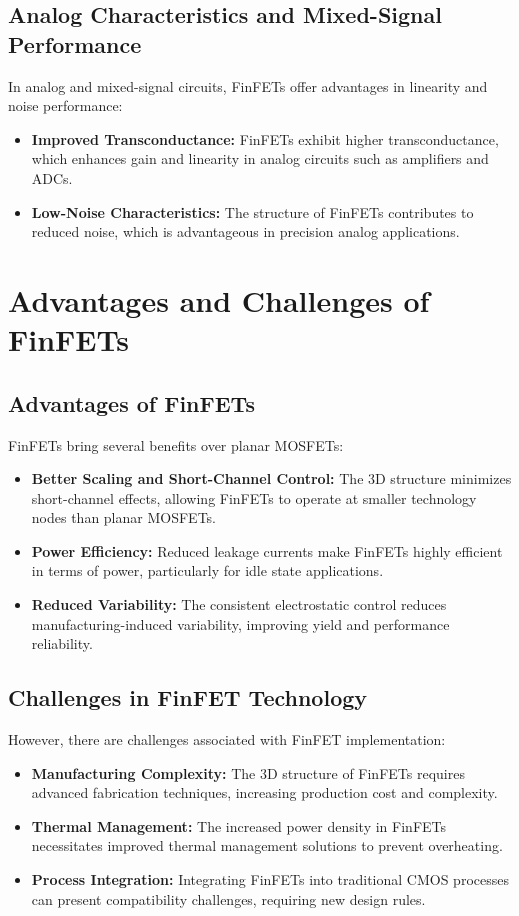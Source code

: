 \documentclass[12pt]{report}
\begin{document}
\begin{titlepage}
\subsection{Analog Characteristics and Mixed-Signal Performance}
In analog and mixed-signal circuits, FinFETs offer advantages in linearity and noise performance:
\begin{itemize}
    \item \textbf{Improved Transconductance:} FinFETs exhibit higher transconductance, which enhances gain and linearity in analog circuits such as amplifiers and ADCs.
    \item \textbf{Low-Noise Characteristics:} The structure of FinFETs contributes to reduced noise, which is advantageous in precision analog applications.
\end{itemize}

\section{Advantages and Challenges of FinFETs}
\subsection{Advantages of FinFETs}
FinFETs bring several benefits over planar MOSFETs:
\begin{itemize}
    \item \textbf{Better Scaling and Short-Channel Control:} The 3D structure minimizes short-channel effects, allowing FinFETs to operate at smaller technology nodes than planar MOSFETs.
    \item \textbf{Power Efficiency:} Reduced leakage currents make FinFETs highly efficient in terms of power, particularly for idle state applications.
    \item \textbf{Reduced Variability:} The consistent electrostatic control reduces manufacturing-induced variability, improving yield and performance reliability.
\end{itemize}

\subsection{Challenges in FinFET Technology}
However, there are challenges associated with FinFET implementation:
\begin{itemize}
    \item \textbf{Manufacturing Complexity:} The 3D structure of FinFETs requires advanced fabrication techniques, increasing production cost and complexity.
    \item \textbf{Thermal Management:} The increased power density in FinFETs necessitates improved thermal management solutions to prevent overheating.
    \item \textbf{Process Integration:} Integrating FinFETs into traditional CMOS processes can present compatibility challenges, requiring new design rules.
\end{itemize}





\end{titlepage}
\end{document}
